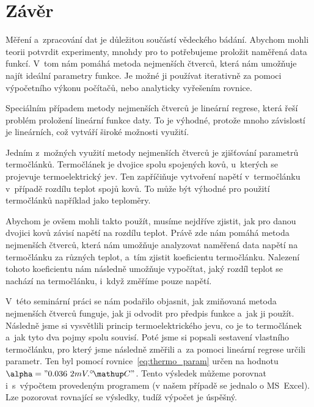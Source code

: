 \section{Závěr}
Měření a~zpracování dat je důležitou součástí vědeckého bádání. Abychom mohli
teorii potvrdit experimenty, mnohdy pro to potřebujeme proložit naměřená data
funkcí. V~tom nám pomáhá metoda nejmenších čtverců, která nám umožňuje najít
ideální parametry funkce. Je možné ji používat iterativně za pomoci výpočetního
výkonu počítačů, nebo analyticky vyřešením rovnice.

Speciálním případem metody nejmenších čtverců je lineární regrese, která řeší
problém proložení lineární funkce daty. To je výhodné, protože mnoho závislostí
je lineárních, což vytváří široké možnosti využití.

Jedním z~možných využití metody nejmenších čtverců je zjišťování parametrů
termočlánků. Termočlánek je dvojice spolu spojených kovů, u~kterých se
projevuje termoelektrický jev. Ten zapříčiňuje vytvoření napětí v~termočlánku
v~případě rozdílu teplot spojů kovů. To může být výhodné pro použití
termočlánků například jako teploměry. 

Abychom je ovšem mohli takto použít, musíme nejdříve zjistit, jak pro danou
dvojici kovů závisí napětí na rozdílu teplot. Právě zde nám pomáhá metoda
nejmenších čtverců, která nám umožňuje analyzovat naměřená data napětí na
termočlánku za různých teplot, a~tím zjistit koeficientu termočlánku.
Nalezení tohoto koeficientu nám následně umožňuje vypočítat, jaký rozdíl teplot
se nachází na termočlánku, i~když změříme pouze napětí.

V~této seminární práci se nám podařilo objasnit, jak zmiňovaná metoda
nejmenších čtverců funguje, jak ji odvodit pro předpis funkce a~jak ji použít.
Následně jsme si vysvětlili princip termoelektrického jevu, co je to
termočlánek a~jak tyto dva pojmy spolu souvisí. Poté jsme si popsali sestavení
vlastního termočlánku, pro který jsme následně změřili a~za pomoci lineární
regrese určili parametr. Ten byl pomocí rovnice~\ref{eq:thermo_param} určen
na hodnotu $\alpha="0.036~2 mV.\C"$. Tento výsledek můžeme porovnat
i~s~výpočtem provedeným programem (v našem případě se jednalo o MS~Excel).
Lze pozorovat rovnající se výsledky, tudíž výpočet je úspěšný.

